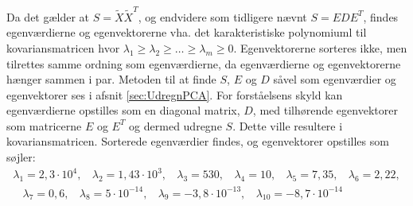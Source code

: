 Da det gælder at $S=\tilde{X}\tilde{X}^T$, og endvidere som tidligere nævnt $S = EDE^T$, findes egenværdierne og egenvektorerne vha. det karakteristiske polynomiuml til kovariansmatricen hvor $\lambda_1 \geq \lambda_2 \geq \ldots \geq \lambda_m \geq 0$. Egenvektorerne sorteres ikke, men tilrettes samme ordning som egenværdierne, da egenværdierne og egenvektorerne hænger sammen i par. Metoden til at finde $S$, $E$ og $D$ såvel som egenværdier og egenvektorer ses i afsnit \ref{sec:UdregnPCA}. For forståelsens skyld kan egenværdierne opstilles som en diagonal matrix, $D$, med tilhørende egenvektorer som matricerne $E$ og $E^T$ og dermed udregne $S$. Dette ville resultere i kovariansmatricen.
Sorterede egenværdier findes, og egenvektorer opstilles som søjler:
\begin{align*}
\lambda_1 = 2,3 \cdot 10^4,\phantom{m}\lambda_2 = 1,43 \cdot 10^3 ,\phantom{m}\lambda_3 = 530,\phantom{m}\lambda_4 = 10,\phantom{m}\lambda_5 = 7,35,\phantom{m}\lambda_6 = 2,22,\\
\phantom{m}\lambda_7 = 0,6,\phantom{m}\lambda_8 = 5 \cdot 10^{-14},\phantom{m}\lambda_9 = -3,8 \cdot 10^{-13},\phantom{m}\lambda_{10} = -8,7 \cdot 10^{-14}
\end{align*}
